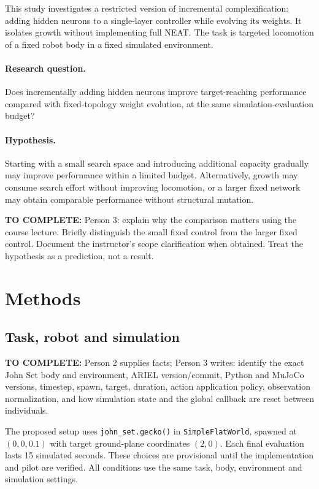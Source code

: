 \documentclass[sigconf,nonacm]{acmart}
\newcommand{\todo}[1]{\par\smallskip\noindent\textcolor{blue!60!black}{\textbf{TO COMPLETE:} #1}\par\smallskip}
\begin{document}
This study investigates a restricted version of incremental complexification:
adding hidden neurons to a single-layer controller while evolving its weights.
It isolates growth without implementing full NEAT. The task is targeted
locomotion of a fixed robot body in a fixed simulated environment.

\paragraph{Research question.}
Does incrementally adding hidden neurons improve target-reaching performance
compared with fixed-topology weight evolution, at the same simulation-evaluation
budget?

\paragraph{Hypothesis.}
Starting with a small search space and introducing additional capacity gradually
may improve performance within a limited budget. Alternatively, growth may
consume search effort without improving locomotion, or a larger fixed network
may obtain comparable performance without structural mutation.

\todo{Person 3: explain why the comparison matters using the course lecture.
Briefly distinguish the small fixed control from the larger fixed control.
Document the instructor's scope clarification when obtained. Treat the
hypothesis as a prediction, not a result.}

\section{Methods}
\subsection{Task, robot and simulation}
\todo{Person 2 supplies facts; Person 3 writes: identify the exact John Set body
and environment, ARIEL version/commit, Python and MuJoCo versions, timestep,
spawn, target, duration, action application policy, observation normalization,
and how simulation state and the global callback are reset between individuals.}

The proposed setup uses \texttt{john\_set.gecko()} in
\texttt{SimpleFlatWorld}, spawned at $(0,0,0.1)$ with target ground-plane
coordinates $(2,0)$. Each final evaluation lasts 15 simulated seconds.
These choices are provisional until the implementation and pilot are verified.
All conditions use the same task, body, environment and simulation settings.
\end{document}
